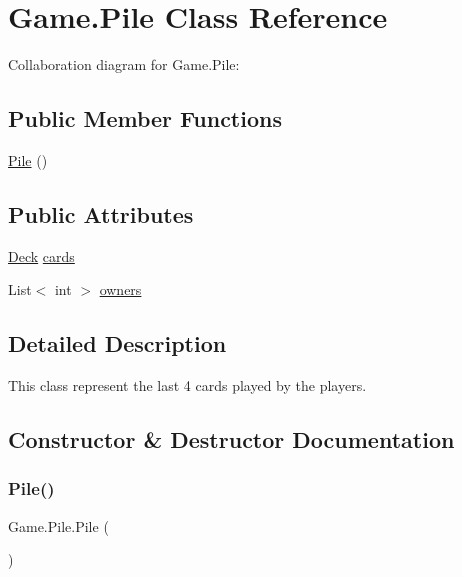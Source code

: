 \hypertarget{class_game_1_1_pile}{}\section{Game.\+Pile Class Reference}
\label{class_game_1_1_pile}


Collaboration diagram for Game.\+Pile\+:
\subsection*{Public Member Functions}
\begin{DoxyCompactItemize}
\item 
\hyperlink{class_game_1_1_pile_a0a0945400c92141d3fc278ac970633e6}{Pile} ()
\end{DoxyCompactItemize}
\subsection*{Public Attributes}
\begin{DoxyCompactItemize}
\item 
\hyperlink{class_game_1_1_deck}{Deck} \hyperlink{class_game_1_1_pile_a487d2e8b498fadfc9046656146c41819}{cards}
\item 
List$<$ int $>$ \hyperlink{class_game_1_1_pile_a0d49178f9402aa7e51101d1d183c1a1d}{owners}
\end{DoxyCompactItemize}


\subsection{Detailed Description}
This class represent the last 4 cards played by the players. 

\subsection{Constructor \& Destructor Documentation}
\mbox{\label{class_game_1_1_pile_a0a0945400c92141d3fc278ac970633e6}} 
\subsubsection{\texorpdfstring{Pile()}{Pile()}}
{\footnotesize\ttfamily Game.\+Pile.\+Pile (\begin{DoxyParamCaption}{ }\end{DoxyParamCaption})\hspace{0.3cm}{\ttfamily [inline]}}

